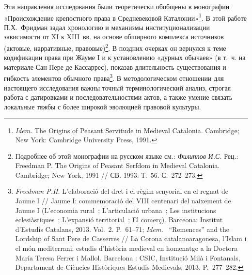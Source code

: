 Эти направления исследования были теоретически обобщены в монографии «Происхождение крепостного права в Средневековой Каталонии»\footnote{\emph{Idem.} The Origins of Peasant Servitude in Medieval Catalonia. Cambridge; New York: Cambridge University Press, 1991.}. В этой работе П.Х.~Фридман задал хронологию и механизмы институционализации зависимости от XI к XIII~вв. на основе обширного комплекса источников (актовые, нарративные, правовые)\footnote{Подробнее об этой монографии на русском языке см.: \emph{Филиппов}\emph{ }\emph{И}\emph{.}\emph{С}\emph{. }Рец.: Freedman P. The Origins of Peasant Serfdom in Medieval Catalonia. Cambridge; New York, 1991 // СВ. 1993. Т.~56. С.~272--273.}. В поздних очерках он вернулся к теме кодификации права при Жауме I и к установлению «дурных обычаев» (в т.~ч. на материале Сан-Пере-де-Кассаррес), показав длительность существования и гибкость элементов обычного права\footnote{\emph{Freedman P.H.} L’elaboració del dret i el règim senyorial en el regnat de Jaume I // Jaume I: commemoració del VIII centenari del naixement de Jaume I (L’economia rural~; L’articulació urbana~; Les institucions eclesiàstiques~; L’expansió territorial~; El comerç). Barceona: Institut d’Estudis Catalans, 2013. Vol.~2. P.~61--71; \emph{Idem.}~ “Remences” and the Lordship of Sant Pere de Casserres // La Corona catalanoaragonesa, l’Islam i el món mediterrani: estudis d’història medieval en homenatge a la Doctora María Teresa Ferrer i Mallol. Barcelona : CSIC, Institució Milà i Fontanals, Departament de Ciències Històriques-Estudis Medievals, 2013. P.~277--282.}. В методологическом отношении для настоящего исследования важны точный терминологический анализ, строгая работа с датировками и последовательностями актов, а также умение связать локальные тяжбы с более широкой эволюцией правовой культуры.

